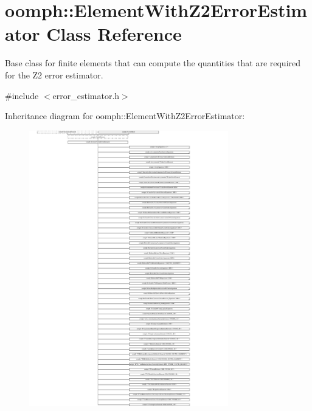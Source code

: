 \hypertarget{classoomph_1_1ElementWithZ2ErrorEstimator}{}\section{oomph\+:\+:Element\+With\+Z2\+Error\+Estimator Class Reference}
\label{classoomph_1_1ElementWithZ2ErrorEstimator}


Base class for finite elements that can compute the quantities that are required for the Z2 error estimator.  




{\ttfamily \#include $<$error\+\_\+estimator.\+h$>$}

Inheritance diagram for oomph\+:\+:Element\+With\+Z2\+Error\+Estimator\+:\begin{figure}[H]
\begin{center}
\leavevmode
\includegraphics[height=12.000000cm]{classoomph_1_1ElementWithZ2ErrorEstimator}
\end{center}
\end{figure}
